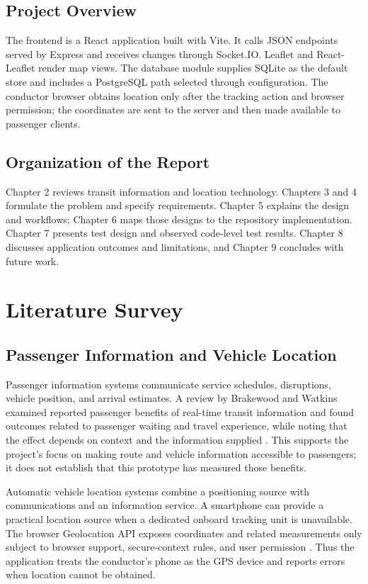 \documentclass[12pt,a4paper]{report}
\begin{document}
\section{Project Overview}
The frontend is a React application built with Vite. It calls JSON endpoints served by Express and receives changes through Socket.IO. Leaflet and React-Leaflet render map views. The database module supplies SQLite as the default store and includes a PostgreSQL path selected through configuration. The conductor browser obtains location only after the tracking action and browser permission; the coordinates are sent to the server and then made available to passenger clients.

\section{Organization of the Report}
Chapter 2 reviews transit information and location technology. Chapters 3 and 4 formulate the problem and specify requirements. Chapter 5 explains the design and workflows; Chapter 6 maps those designs to the repository implementation. Chapter 7 presents test design and observed code-level test results. Chapter 8 discusses application outcomes and limitations, and Chapter 9 concludes with future work.

\chapter{Literature Survey}
\section{Passenger Information and Vehicle Location}
Passenger information systems communicate service schedules, disruptions, vehicle position, and arrival estimates. A review by Brakewood and Watkins examined reported passenger benefits of real-time transit information and found outcomes related to passenger waiting and travel experience, while noting that the effect depends on context and the information supplied \cite{brakewood2019}. This supports the project's focus on making route and vehicle information accessible to passengers; it does not establish that this prototype has measured those benefits.

Automatic vehicle location systems combine a positioning source with communications and an information service. A smartphone can provide a practical location source when a dedicated onboard tracking unit is unavailable. The browser Geolocation API exposes coordinates and related measurements only subject to browser support, secure-context rules, and user permission \cite{w3cgeo}. Thus the application treats the conductor's phone as the GPS device and reports errors when location cannot be obtained.
\end{document}
